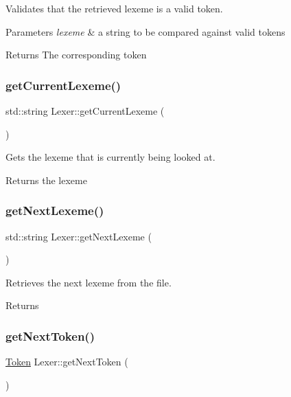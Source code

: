 Validates that the retrieved lexeme is a valid token. 
\begin{DoxyParams}{Parameters}
{\em lexeme} & a string to be compared against valid tokens \\
\hline
\end{DoxyParams}
\begin{DoxyReturn}{Returns}
The corresponding token 
\end{DoxyReturn}
\hypertarget{class_lexer_a7fac880306793388754a6f9da34c3493}{}\label{class_lexer_a7fac880306793388754a6f9da34c3493} 
\subsubsection{\texorpdfstring{get\+Current\+Lexeme()}{getCurrentLexeme()}}
{\footnotesize\ttfamily std\+::string Lexer\+::get\+Current\+Lexeme (\begin{DoxyParamCaption}{ }\end{DoxyParamCaption})}

Gets the lexeme that is currently being looked at. \begin{DoxyReturn}{Returns}
the lexeme 
\end{DoxyReturn}
\hypertarget{class_lexer_a97988fed0390931fa45fe8a8fee39e2f}{}\label{class_lexer_a97988fed0390931fa45fe8a8fee39e2f} 
\subsubsection{\texorpdfstring{get\+Next\+Lexeme()}{getNextLexeme()}}
{\footnotesize\ttfamily std\+::string Lexer\+::get\+Next\+Lexeme (\begin{DoxyParamCaption}{ }\end{DoxyParamCaption})\hspace{0.3cm}{\ttfamily [private]}}

Retrieves the next lexeme from the file. \begin{DoxyReturn}{Returns}

\end{DoxyReturn}
\hypertarget{class_lexer_aa8d555ee90674216793bb43c05bba64f}{}\label{class_lexer_aa8d555ee90674216793bb43c05bba64f} 
\subsubsection{\texorpdfstring{get\+Next\+Token()}{getNextToken()}}
{\footnotesize\ttfamily \hyperlink{_lexer_8h_a6a9e93b081bad7fc74c17306fb168c1f}{Token} Lexer\+::get\+Next\+Token (\begin{DoxyParamCaption}{ }\end{DoxyParamCaption})}

